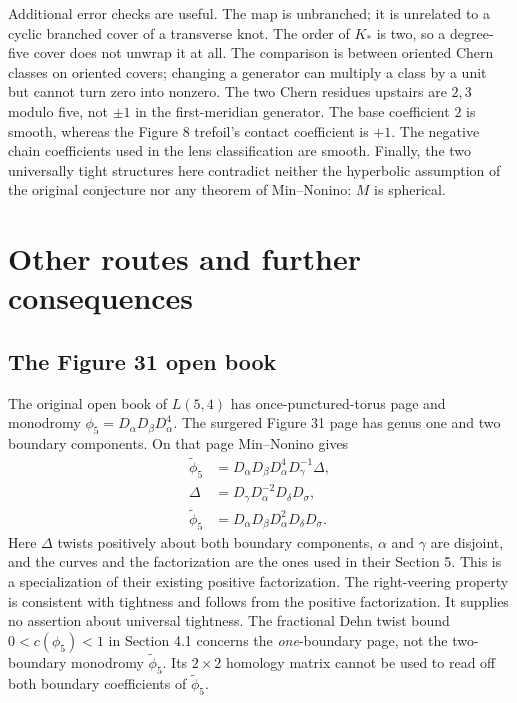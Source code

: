 \documentclass[12pt]{amsart}
\theoremstyle{definition}
\theoremstyle{remark}
\numberwithin{equation}{section}
\theoremstyle{definition}
\begin{document}
Additional error checks are useful. The map is unbranched; it is unrelated to a cyclic branched cover of a transverse knot. The order of $K_*$ is two, so a degree-five cover does not unwrap it at all. The comparison is between oriented Chern classes on oriented covers; changing a generator can multiply a class by a unit but cannot turn zero into nonzero. The two Chern residues upstairs are $2,3$ modulo five, not $\pm1$ in the first-meridian generator. The base coefficient $2$ is smooth, whereas the Figure 8 trefoil's contact coefficient is $+1$. The negative chain coefficients used in the lens classification are smooth. Finally, the two universally tight structures here contradict neither the hyperbolic assumption of the original conjecture nor any theorem of Min--Nonino: $M$ is spherical.

\section{Other routes and further consequences}\label{en-further}
\subsection{The Figure 31 open book}
The original open book of $L(5,4)$ has once-punctured-torus page and monodromy $\phi_5=D_\alpha D_\beta D_\alpha^4$. The surgered Figure 31 page has genus one and two boundary components. On that page Min--Nonino gives
\begin{equation*}\begin{aligned}
\widetilde\phi_5&=D_\alpha D_\beta D_\alpha^4D_\gamma^{-1}\Delta,\\
\Delta&=D_\gamma D_\alpha^{-2}D_\delta D_\sigma,\\
\widetilde\phi_5&=D_\alpha D_\beta D_\alpha^2D_\delta D_\sigma.
\end{aligned}\end{equation*}
Here $\Delta$ twists positively about both boundary components, $\alpha$ and $\gamma$ are disjoint, and the curves and the factorization are the ones used in their Section 5. This is a specialization of their existing positive factorization. The right-veering property is consistent with tightness and follows from the positive factorization. It supplies no assertion about universal tightness. The fractional Dehn twist bound $0<c(\phi_5)<1$ in Section 4.1 concerns the \emph{one}-boundary page, not the two-boundary monodromy $\widetilde\phi_5$. Its $2\times2$ homology matrix cannot be used to read off both boundary coefficients of $\widetilde\phi_5$.
\end{document}
